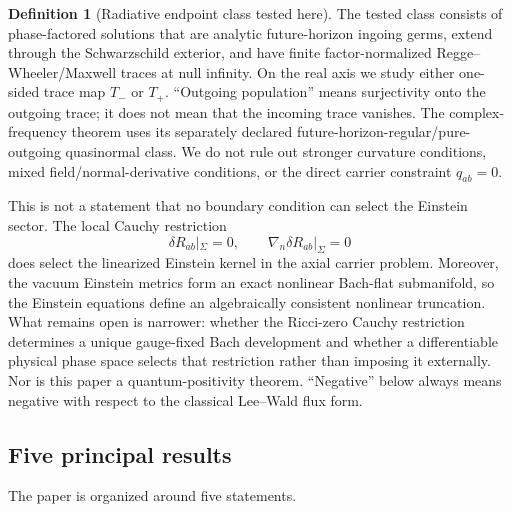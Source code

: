 \documentclass[11pt]{article}
\theoremstyle{definition}
\newtheorem{definition}[theorem]{Definition}
\theoremstyle{remark}
\begin{document}
\begin{definition}[Radiative endpoint class tested here]
\label{def:radiative-class}
The tested class consists of phase-factored solutions that are analytic
future-horizon ingoing germs, extend through the Schwarzschild exterior, and
have finite factor-normalized Regge--Wheeler/Maxwell traces at null infinity.
On the real axis we study either one-sided trace map \(T_-\) or \(T_+\).
``Outgoing population'' means surjectivity onto the outgoing trace; it does
not mean that the incoming trace vanishes.  The complex-frequency theorem
uses its separately declared future-horizon-regular/pure-outgoing
quasinormal class.  We do not rule out stronger curvature conditions, mixed
field/normal-derivative conditions, or the direct carrier constraint
\(q_{ab}=0\).
\end{definition}

This is not a statement that no boundary condition can select the Einstein
sector.  The local Cauchy restriction
\[
\delta R_{ab}|_\Sigma=0,
\qquad
\nabla_n\delta R_{ab}|_\Sigma=0
\]
does select the linearized Einstein kernel in the axial carrier problem.
Moreover, the vacuum Einstein metrics form an exact nonlinear Bach-flat
submanifold, so the Einstein equations define an algebraically consistent
nonlinear truncation.  What remains open is narrower: whether the Ricci-zero
Cauchy restriction determines a unique gauge-fixed Bach development and
whether a differentiable physical phase space selects that restriction
rather than imposing it externally.
Nor is this paper a quantum-positivity theorem.  ``Negative'' below always
means negative with respect to the classical Lee--Wald flux form.

\subsection{Five principal results}

The paper is organized around five statements.
\end{document}
